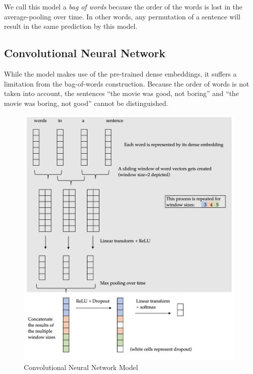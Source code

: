 \documentclass[11pt]{article}
\begin{document}
We call this model a \emph{bag of words} because the order of the words is lost
in the average-pooling over time. In other words, any permutation of a sentence
will result in the same prediction by this model. 

\subsection{Convolutional Neural Network}
\label{subsec:convnet}

While the  model makes use of the pre-trained dense
embeddings, it suffers a limitation from the bag-of-words construction. Because
the order of words is not taken into account, the sentences ``the movie was
good, not boring'' and ``the movie was boring, not good'' cannot be
distinguished. 

\begin{figure}[htb]
\centering
\includegraphics[width=\textwidth]{figs/convnet.png}
\caption{Convolutional Neural Network Model}
\label{fig:convnet}
\end{figure}
\end{document}
